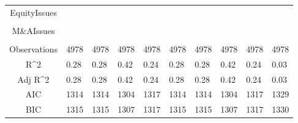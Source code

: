 \documentclass{article}
\begin{document}
\begin{table}[H]
\begin{tabular}{|clllllllll|}
  EquityIssues &  &  &  &  &  &  &  &  &  \\ 
   &  &  &  &  &  &  &  &  &  \\ 
  M\&AIssues &  &  &  &  &  &  &  &  &  \\ 
   &  &  &  &  &  &  &  &  &  \\ 
  \hline 
 Observations & 4978 & 4978 & 4978 & 4978 & 4978 & 4978 & 4978 & 4978 & 4978 \\ 
  R^2 & 0.28 & 0.28 & 0.42 & 0.24 & 0.28 & 0.28 & 0.42 & 0.24 & 0.03 \\ 
  Adj R^2 & 0.28 & 0.28 & 0.42 & 0.24 & 0.28 & 0.28 & 0.42 & 0.24 & 0.03 \\ 
  AIC & 1314 & 1314 & 1304 & 1317 & 1314 & 1314 & 1304 & 1317 & 1329 \\ 
  BIC & 1315 & 1315 & 1307 & 1317 & 1315 & 1315 & 1307 & 1317 & 1330 \\ 
   \hline
\end{tabular}
 
\end{table}
\end{document}
